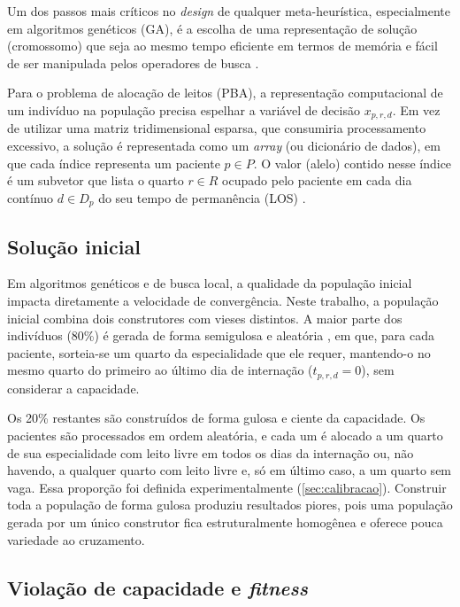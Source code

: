 Um dos passos mais críticos no \textit{design} de qualquer meta-heurística, especialmente em algoritmos genéticos (GA), é a escolha de uma representação de solução (cromossomo) que seja ao mesmo tempo eficiente em termos de memória e fácil de ser manipulada pelos operadores de busca \cite{talbi2009metaheuristics}. 

Para o problema de alocação de leitos (PBA), a representação computacional de um indivíduo na população precisa espelhar a variável de decisão $x_{p,r,d}$. Em vez de utilizar uma matriz tridimensional esparsa, que consumiria processamento excessivo, a solução é representada como um \textit{array} (ou dicionário de dados), em que cada índice representa um paciente $p \in P$. O valor (alelo) contido nesse índice é um subvetor que lista o quarto $r \in R$ ocupado pelo paciente em cada dia contínuo $d \in D_p$ do seu tempo de permanência (LOS) \cite{demeester2010hybrid, ceschia2012modeling}.

\subsection{Solução inicial}
\label{sec:solucao-inicial}

Em algoritmos genéticos e de busca local, a qualidade da população inicial impacta diretamente a velocidade de convergência. Neste trabalho, a população inicial combina dois construtores com vieses distintos. A maior parte dos indivíduos (80\%) é gerada de forma semigulosa e aleatória \cite{ceschia2012modeling}, em que, para cada paciente, sorteia-se um quarto da especialidade que ele requer, mantendo-o no mesmo quarto do primeiro ao último dia de internação ($t_{p,r,d} = 0$), sem considerar a capacidade.

Os 20\% restantes são construídos de forma gulosa e ciente da capacidade. Os pacientes são processados em ordem aleatória, e cada um é alocado a um quarto de sua especialidade com leito livre em todos os dias da internação ou, não havendo, a qualquer quarto com leito livre e, só em último caso, a um quarto sem vaga. Essa proporção foi definida experimentalmente (\autoref{sec:calibracao}). Construir toda a população de forma gulosa produziu resultados piores, pois uma população gerada por um único construtor fica estruturalmente homogênea e oferece pouca variedade ao cruzamento.

\subsection{Violação de capacidade e \textit{fitness}}

